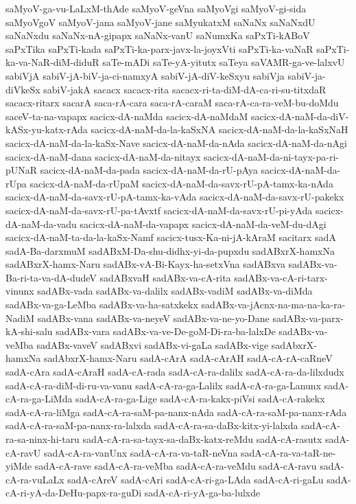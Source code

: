 {saMyoV-ga-vu-LaLxM-thAde
saMyoV-geVna
saMyoVgi
saMyoV-gi-sida
saMyoVgoV
saMyoV-jana
saMyoV-jane
saMyukatxM
saNaNx
saNaNxdU
saNaNxdu
saNaNx-nA-gipapx
saNaNx-vanU
saNumxKa
saPxTi-kABoV
saPxTika
saPxTi-kada
saPxTi-ka-parx-javx-la-joyxVti
saPxTi-ka-vaNaR
saPxTi-ka-va-NaR-diM-diduR
saTe-mADi
saTe-yA-yitutx
saTeya
saVAMR-ga-ve-lalxvU
sabiVjA
sabiV-jA-biV-ja-ci-namxyA
sabiV-jA-diV-keSxyu
sabiVja
sabiV-ja-diVkeSx
sabiV-jakA
sacacx
sacacx-rita
sacacx-ri-ta-diM-dA-ca-ri-su-titxdaR
sacacx-ritarx
sacarA
saca-rA-cara
saca-rA-caraM
saca-rA-ca-ra-veM-bu-doMdu
saceV-ta-na-vapapx
sacicx-dA-naMda
sacicx-dA-naMdaM
sacicx-dA-naM-da-diV-kASx-yu-katx-rAda
sacicx-dA-naM-da-la-kaSxNA
sacicx-dA-naM-da-la-kaSxNaH
sacicx-dA-naM-da-la-kaSx-Nave
sacicx-dA-naM-da-nAda
sacicx-dA-naM-da-nAgi
sacicx-dA-naM-dana
sacicx-dA-naM-da-nitayx
sacicx-dA-naM-da-ni-tayx-pa-ri-pUNaR
sacicx-dA-naM-da-pada
sacicx-dA-naM-da-rU-pAya
sacicx-dA-naM-da-rUpa
sacicx-dA-naM-da-rUpaM
sacicx-dA-naM-da-savx-rU-pA-tamx-ka-nAda
sacicx-dA-naM-da-savx-rU-pA-tamx-ka-vAda
sacicx-dA-naM-da-savx-rU-pakekx
sacicx-dA-naM-da-savx-rU-pa-tAvxtf
sacicx-dA-naM-da-savx-rU-pi-yAda
sacicx-dA-naM-da-vadu
sacicx-dA-naM-da-vapapx
sacicx-dA-naM-da-veM-du-dAgi
sacicx-dA-naM-ta-da-la-kaSx-Namf
sacicx-tusx-Ka-ni-jA-kAraM
sacitarx
sadA
sadA-Ba-darxmuM
sadABxM-Da-shu-didhx-yi-da-pupxdu
sadABxrX-hamxNa
sadABxrX-hamx-Naru
sadABx-vA-Bi-Kayx-ha-setxVna
sadABxva
sadABx-va-Ba-ri-ta-va-dA-dudeV
sadABxvaH
sadABx-va-cA-rita
sadABx-va-cA-ri-tarx-vinunx
sadABx-vada
sadABx-va-dalilx
sadABx-vadiM
sadABx-va-diMda
sadABx-va-ga-LeMba
sadABx-va-ha-satxkekx
sadABx-va-jAcnx-na-ma-na-ka-ra-NadiM
sadABx-vana
sadABx-va-neyeV
sadABx-va-ne-yo-Dane
sadABx-va-parx-kA-shi-salu
sadABx-vara
sadABx-va-ve-De-goM-Di-ra-ba-lalxDe
sadABx-va-veMba
sadABx-vaveV
sadABxvi
sadABx-vi-gaLa
sadABx-vige
sadAbxrX-hamxNa
sadAbxrX-hamx-Naru
sadA-cArA
sadA-cArAH
sadA-cA-rA-caRneV
sadA-cAra
sadA-cAraH
sadA-cA-rada
sadA-cA-ra-dalilx
sadA-cA-ra-da-lilxdudx
sadA-cA-ra-diM-di-ru-va-vanu
sadA-cA-ra-ga-Lalilx
sadA-cA-ra-ga-Lanunx
sadA-cA-ra-ga-LiMda
sadA-cA-ra-ga-Lige
sadA-cA-ra-kakx-piVsi
sadA-cA-rakekx
sadA-cA-ra-liMga
sadA-cA-ra-saM-pa-nanx-nAda
sadA-cA-ra-saM-pa-nanx-rAda
sadA-cA-ra-saM-pa-nanx-ra-lalxda
sadA-cA-ra-sa-daBx-kitx-yi-lalxda
sadA-cA-ra-sa-ninx-hi-taru
sadA-cA-ra-sa-tayx-sa-daBx-katx-reMdu
sadA-cA-rasutx
sadA-cA-ravU
sadA-cA-ra-vanUnx
sadA-cA-ra-va-taR-neVna
sadA-cA-ra-va-taR-ne-yiMde
sadA-cA-rave
sadA-cA-ra-veMba
sadA-cA-ra-veMdu
sadA-cA-ravu
sadA-cA-ra-vuLaLx
sadA-cAreV
sadA-cAri
sadA-cA-ri-ga-LAda
sadA-cA-ri-gaLu
sadA-cA-ri-yA-da-DeHu-papx-ra-guDi
sadA-cA-ri-yA-ga-ba-lulxde
}
